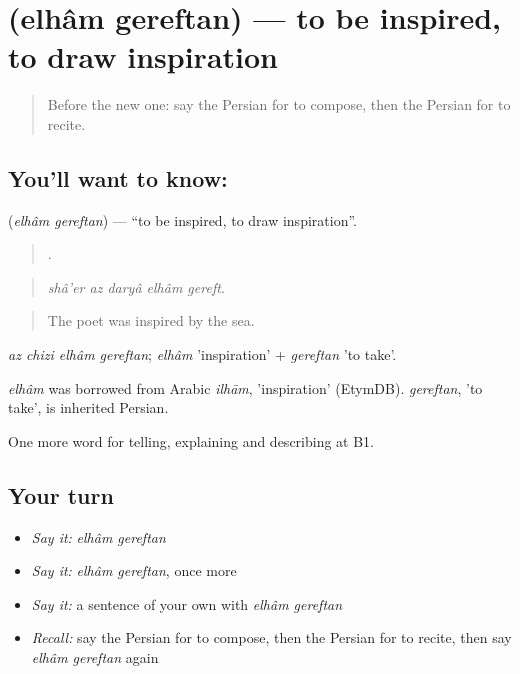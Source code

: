 \section[\texorpdfstring{\fa{الهام} \fa{گرفتن} (elhâm gereftan)}{الهام گرفتن (elhâm gereftan)}]{  (elhâm gereftan) — to be inspired, to draw inspiration}

\label{lesson:FA-C522-elham-gereftan}



\begin{quote}
Before the new one: say the Persian for to compose, then the Persian for to recite.
\end{quote}

\subsection*{You'll want to know:  }
\textbf{ } (\emph{elhâm gereftan}) — \textquotedblleft{}to be inspired, to draw inspiration\textquotedblright{}.

\begin{quote}
    .
\end{quote}

\begin{quote}
\emph{shâ'er az daryâ elhâm gereft.}
\end{quote}

\begin{quote}
The poet was inspired by the sea.
\end{quote}

\emph{az chizi elhâm gereftan}; \emph{elhâm} 'inspiration' + \emph{gereftan} 'to take'.

\begin{cousinweb}
\emph{elhâm} was borrowed from Arabic \emph{ilhām}, 'inspiration' (EtymDB). \emph{gereftan}, 'to take', is inherited Persian.
\end{cousinweb}

\begin{grammarlens}[title={What you've built}]
One more word for telling, explaining and describing at B1.
\end{grammarlens}

\subsection*{Your turn}
\begin{itemize}
\raggedright
  \item \emph{Say it:} \emph{elhâm gereftan}
  \item \emph{Say it:} \emph{elhâm gereftan}, once more
  \item \emph{Say it:} a sentence of your own with \emph{elhâm gereftan}
  \item \emph{Recall:} say the Persian for to compose, then the Persian for to recite, then say \emph{elhâm gereftan} again
\end{itemize}


